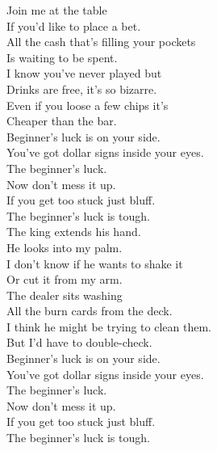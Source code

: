 
\label{album:gumboot-soup}




Join me at the table \\
If you'd like to place a bet. \\
All the cash that's filling your pockets \\
Is waiting to be spent. \\
I know you've never played but \\
Drinks are free, it's so bizarre. \\
Even if you loose a few chips it's \\
Cheaper than the bar. \\

Beginner's luck is on your side. \\
You've got dollar signs inside your eyes. \\

The beginner's luck. \\
Now don't mess it up. \\
If you get too stuck just bluff. \\
The beginner's luck is tough. \\

The king extends his hand. \\
He looks into my palm. \\
I don't know if he wants to shake it \\
Or cut it from my arm. \\
The dealer sits washing \\
All the burn cards from the deck. \\
I think he might be trying to clean them. \\
But I'd have to double-check. \\

Beginner's luck is on your side. \\
You've got dollar signs inside your eyes. \\

The beginner's luck. \\
Now don't mess it up. \\
If you get too stuck just bluff. \\
The beginner's luck is tough. \\

